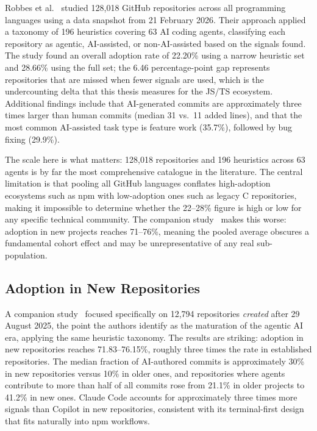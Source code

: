 Robbes et al.~\cite{robbesAgenticMuch2026} studied 128,018 GitHub repositories
across all programming languages using a data snapshot from 21 February 2026.
Their approach applied a taxonomy of 196 heuristics covering 63 AI coding
agents, classifying each repository as agentic, AI-assisted, or non-AI-assisted
based on the signals found. The study found an overall adoption rate of
22.20\% using a narrow heuristic set and 28.66\% using the full set; the
6.46 percentage-point gap represents repositories that are missed when fewer
signals are used, which is the undercounting delta that this thesis measures
for the JS/TS ecosystem. Additional findings include that AI-generated commits
are approximately three times larger than human commits (median 31 vs.\ 11 added
lines), and that the most common AI-assisted task type is feature work (35.7\%),
followed by bug fixing (29.9\%).

The scale here is what matters: 128,018 repositories and 196 heuristics across
63 agents is by far the most comprehensive catalogue in the literature. The
central limitation is that pooling all GitHub languages conflates high-adoption
ecosystems such as npm with low-adoption ones such as legacy C repositories, making
it impossible to determine whether the 22--28\% figure is high or low for any
specific technical community. The companion study~\cite{robbesAgenticVery2026}
makes this worse: adoption in new projects reaches 71--76\%, meaning the
pooled average obscures a fundamental cohort effect and may be unrepresentative
of any real sub-population.

\subsection{Adoption in New Repositories}

A companion study~\cite{robbesAgenticVery2026} focused specifically on 12,794
repositories \emph{created} after 29 August 2025, the point the authors identify
as the maturation of the agentic AI era, applying the same heuristic taxonomy.
The results are striking: adoption in new repositories reaches 71.83--76.15\%,
roughly three times the rate in established repositories. The median fraction of
AI-authored commits is approximately 30\% in new repositories versus 10\% in older
ones, and repositories where agents contribute to more than half of all commits
rose from 21.1\% in older projects to 41.2\% in new ones. Claude Code accounts
for approximately three times more signals than Copilot in new repositories,
consistent with its terminal-first design that fits naturally into npm workflows.

